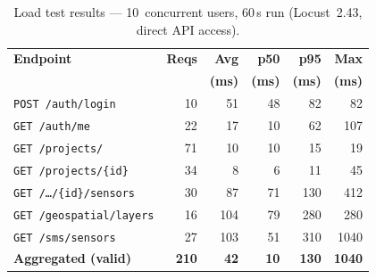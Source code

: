 \begin{table}[p]
  \centering
  \small
  \caption{Load test results --- 10~concurrent users, 60\,s run
           (Locust~2.43, direct API access).}
  \label{tab:load-test-10u}
  \begin{tabular}{@{} l r r r r r @{}}
    \toprule
    \textbf{Endpoint} & \textbf{Reqs} & \textbf{Avg} &
      \textbf{p50} & \textbf{p95} & \textbf{Max} \\
    & & \textbf{(ms)} & \textbf{(ms)} & \textbf{(ms)} & \textbf{(ms)} \\
    \midrule
    \texttt{POST /auth/login}          & 10  & 51  & 48  & 82   & 82   \\
    \texttt{GET /auth/me}              & 22  & 17  & 10  & 62   & 107  \\
    \texttt{GET /projects/}            & 71  & 10  & 10  & 15   & 19   \\
    \texttt{GET /projects/\{id\}}      & 34  & 8   & 6   & 11   & 45   \\
    \texttt{GET /\ldots/\{id\}/sensors} & 30 & 87 & 71  & 130  & 412  \\
    \texttt{GET /geospatial/layers}    & 16  & 104 & 79  & 280  & 280  \\
    \texttt{GET /sms/sensors}          & 27  & 103 & 51  & 310  & 1040 \\
    \midrule
    \textbf{Aggregated (valid)}        & \textbf{210} & \textbf{42} & \textbf{10}
      & \textbf{130} & \textbf{1040} \\
    \bottomrule
  \end{tabular}
\end{table}

